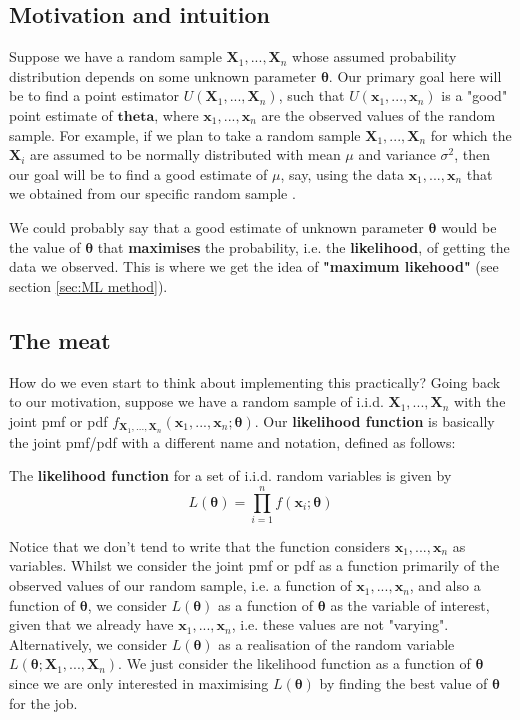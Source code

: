 \subsection{Motivation and intuition}
Suppose we have a random sample \(\bm{X}_1,...,\bm{X}_n\) whose assumed probability distribution depends on some unknown parameter \(\bm{\theta}\). 
Our primary goal here will be to find a point estimator \(U(\bm{X}_1,...,\bm{X}_n)\), such that \(U(\bm{x}_1,...,\bm{x}_n)\) is a "good" point estimate of \(\bm{theta}\), where \(\bm{x}_1,...,\bm{x}_n\) are the observed values of the random sample. 
For example, if we plan to take a random sample \(\bm{X}_1,...,\bm{X}_n\) for which the \(\bm{X}_i\) are assumed to be normally distributed with mean \(\mu\) and variance \(\sigma^2\), then our goal will be to find a good estimate of \(\mu\), say, using the data \(\bm{x}_1,...,\bm{x}_n\) that we obtained from our specific random sample \autocite{penn415}.

\bigskip

We could probably say that a good estimate of unknown parameter \(\bm{\theta}\) would be the value of \(\bm{\theta}\) that \textbf{maximises} the probability, i.e. the \textbf{likelihood}, of getting the data we observed. 
This is where we get the idea of \textbf{"maximum likehood"} (see section \ref{sec:ML method}). 

\subsection{The meat}
How do we even start to think about implementing this practically?
Going back to our motivation, suppose we have a random sample of i.i.d. \(\bm{X}_1,...,\bm{X}_n\) with the joint pmf or pdf \(f_{\bm{X}_1,...,\bm{X}_n}(\bm{x}_1,...,\bm{x}_n;\bm{\theta})\). 
Our \textbf{likelihood function} is basically the joint pmf/pdf with a different name and notation, defined as follows:

\begin{definition}\label{defn:likelihood func}
    The \textbf{likelihood function} for a set of i.i.d. random variables is given by
    \begin{equation}\label{eq:likelihood func}
        L(\bm{\theta}) = \prod_{i=1}^n f(\bm{x}_i;\bm{\theta})
    \end{equation}
\end{definition}

Notice that we don't tend to write that the function considers \(\bm{x}_1,...,\bm{x}_n\) as variables. 
Whilst we consider the joint pmf or pdf as a function primarily of the observed values of our random sample, i.e. a function of \(\bm{x}_1,...,\bm{x}_n\), and also a function of \(\bm{\theta}\), we consider \(L(\bm{\theta})\) as a function of \(\bm{\theta}\) as the variable of interest, given that we already have \(\bm{x}_1,...,\bm{x}_n\), i.e. these values are not "varying".
Alternatively, we consider \(L(\bm{\theta})\) as a realisation of the random variable \(L(\bm{\theta};\bm{X}_1,...,\bm{X}_n)\).
We just consider the likelihood function as a function of \(\bm{\theta}\) since we are only interested in maximising \(L(\bm{\theta})\) by finding the best value of \(\bm{\theta}\) for the job. 

